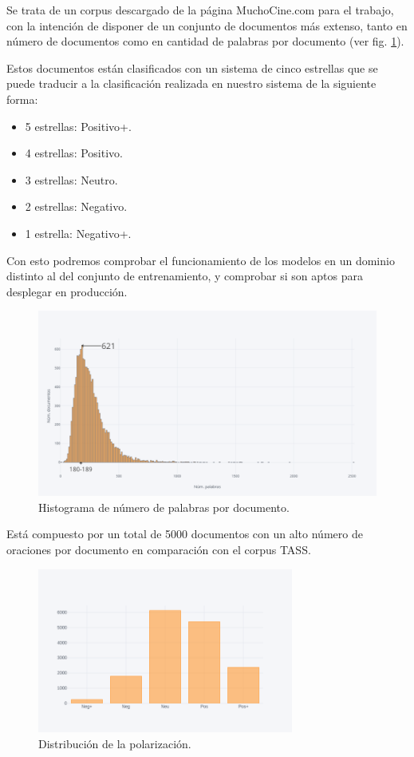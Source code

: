 Se trata de un corpus descargado de la página MuchoCine.com para el trabajo, con la intención de disponer de un conjunto de documentos más extenso, tanto en número de documentos como en cantidad de palabras por documento (ver fig. \ref{dist_tokes_pelis}).

Estos documentos están clasificados con un sistema de cinco estrellas que se puede traducir a la clasificación realizada en nuestro sistema de la siguiente forma:

\begin{itemize}
	\item 5 estrellas: Positivo+.
	\item 4 estrellas: Positivo.
	\item 3 estrellas: Neutro.
	\item 2 estrellas: Negativo.
	\item 1 estrella: Negativo+.
\end{itemize}

Con esto podremos comprobar el funcionamiento de los modelos en un dominio distinto al del conjunto de entrenamiento, y comprobar si son aptos para desplegar en producción.

\begin{figure}[!ht]
	\centering
	\includegraphics[width=1\textwidth]{imaxes/distTokensCine.png}
	\caption{Histograma de número de palabras por documento.}
	\label{dist_tokes_pelis}
\end{figure}

Está compuesto por un total de 5000 documentos con un alto número de oraciones por documento en comparación con el corpus TASS.

\begin{figure}[!ht]
	\centering
	\includegraphics[width=0.75\textwidth]{imaxes/distCine.png}
	\caption{Distribución de la polarización.}
	\label{dist_pos_pelis}
\end{figure}

